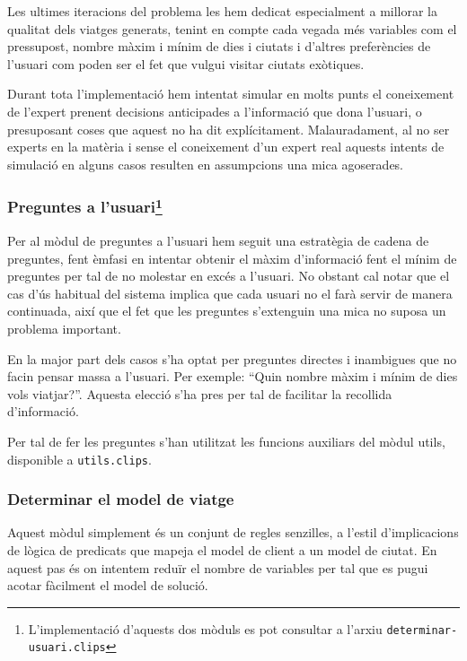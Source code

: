 \documentclass[11pt,a4paper]{article}
\begin{document}
Les ultimes iteracions del problema les hem dedicat especialment a millorar la qualitat dels viatges generats, tenint en compte cada vegada més variables com el pressupost, nombre màxim i mínim de dies i ciutats i d'altres preferències de l'usuari com poden ser el fet que vulgui visitar ciutats exòtiques.

Durant tota l'implementació hem intentat simular en molts punts el coneixement de l'expert prenent decisions anticipades a l'informació que dona l'usuari, o presuposant coses que aquest no ha dit explícitament. Malauradament, al no ser experts en la matèria i sense el coneixement d'un expert real aquests intents de simulació en alguns casos resulten en assumpcions una mica agoserades.

\subsubsection*{Preguntes a l'usuari\footnote{L'implementació d'aquests dos mòduls es pot consultar a l'arxiu \texttt{determinar-usuari.clips}}}



Per al mòdul de preguntes a l'usuari hem seguit una estratègia de cadena de preguntes, fent èmfasi en intentar obtenir el màxim d'informació fent el mínim de preguntes per tal de no molestar en excés a l'usuari. No obstant cal notar que el cas d'ús habitual del sistema implica que cada usuari no el farà servir de manera continuada, així que el fet que les preguntes s'extenguin una mica no suposa un problema important.

En la major part dels casos s'ha optat per preguntes directes i inambigues que no facin pensar massa a l'usuari. Per exemple: ``Quin nombre màxim i mínim de dies vols viatjar?''. Aquesta elecció s'ha pres per tal de facilitar la recollida d'informació.

Per tal de fer les preguntes s'han utilitzat les funcions auxiliars del mòdul utils, disponible a \texttt{utils.clips}.

\subsubsection*{Determinar el model de viatge}

Aquest mòdul simplement és un conjunt de regles senzilles, a l'estil d'implicacions de lògica de predicats que mapeja el model de client a un model de ciutat. En aquest pas és on intentem reduïr el nombre de variables per tal que es pugui acotar fàcilment el model de solució.
\end{document}
